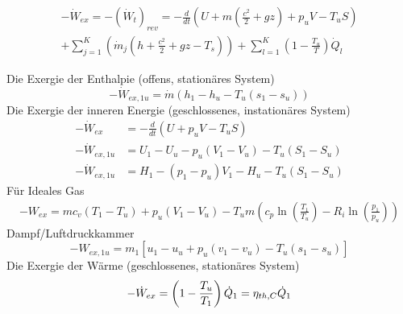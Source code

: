 \documentclass[twocolumn]{article}
\begin{document}
\begin{multline*}
	-\dot{W}_{ex} = - (\dot{W}_t)_{rev} = -\frac{d}{dt} \left( U + m\left ( \frac{c^2}{2}+ gz \right) + p_uV - T_uS \right) \\  +  \sum_{j=1}^{K} \left(\dot{m}_j \left(h + \frac{c^2}{2} + gz -T_s \right) \right) + \sum_{l=1}^{K} \left( 1 - \frac{T_u}{T}\right) \dot{Q}_l 
\end{multline*}


Die Exergie der Enthalpie (offens, stationäres System)
\begin{equation*}
	-\dot{W}_{ex,1u} = \dot{m}(h_1 - h_u -T_u(s_1 - s_u))
\end{equation*}
Die Exergie der inneren Energie (geschlossenes, instationäres System)
\begin{align*}
	- \dot{W}_{ex} &= - \frac{d}{dt}(U + p_uV -T_uS) \\
	-\dot{W}_{ex,1u} &= U_1 - U_u -p_u(V_1 - V_u) - T_u(S_1 - S_u) \\
	-\dot{W}_{ex,1u} &= H_1 - (p_1-p_u)V_1 - H_u- T_u(S_1 - S_u)
\end{align*}
Für Ideales Gas \\
\begin{align*}
	-W_{ex} = mc_v(T_1 -T_u) + p_u(V_1 - V_u) - T_um \left(c_p \ln \left(\frac{T_1}{T_u}\right) -R_i \ln \left(\frac{p_1}{p_u}\right)\right)
\end{align*}
Dampf/Luftdruckkammer
\begin{equation*}
	-W_{ex,1u} = m_1 [ u_1 - u_u + p_u ( v_1 - v_u) - T_u(s_1 - s_u)]
\end{equation*}
Die Exergie der Wärme (geschlossenes, stationäres System)
\begin{equation*}
	- \dot{W}_{ex} = \left(1 - \frac{T_u}{T_1} \right) \dot{Q}_1 = \eta_{th,C} \dot{Q}_1 \\
\end{equation*}
\end{document}
